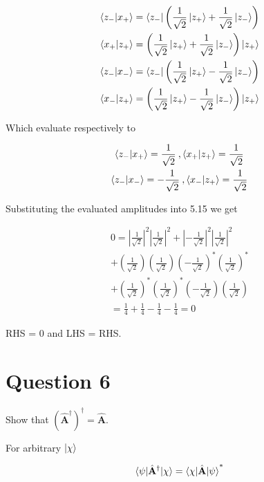\documentclass{article}
\let\oldhat\hat
\renewcommand{\hat}[1]{\oldhat{\mathbf{#1}}}
\begin{document}
    \begin{gather}
        \braket{z_-|x_+} = \bra{z_-}\left( \frac{1}{\sqrt{2}}\ket{z_+} + \frac{1}{\sqrt{2}}\ket{z_-} \right)\\
        \braket{x_+|z_+} = \left( \frac{1}{\sqrt{2}}\ket{z_+} + \frac{1}{\sqrt{2}}\ket{z_-} \right)\ket{z_+}\\
        \braket{z_-|x_-} = \bra{z_-}\left( \frac{1}{\sqrt{2}}\ket{z_+} - \frac{1}{\sqrt{2}}\ket{z_-} \right)\\
        \braket{x_-|z_+} = \left( \frac{1}{\sqrt{2}}\ket{z_+} - \frac{1}{\sqrt{2}}\ket{z_-} \right)\ket{z_+}
    \end{gather}

    Which evaluate respectively to

    \begin{gather}
        \braket{z_-|x_+} = \frac{1}{\sqrt{2}}\:,
        \braket{x_+|z_+} = \frac{1}{\sqrt{2}}\\
        \braket{z_-|x_-} = -\frac{1}{\sqrt{2}}\:,
        \braket{x_-|z_+} = \frac{1}{\sqrt{2}}
    \end{gather}

    Substituting the evaluated amplitudes into 5.15 we get

    \begin{gather*}
        0 = |\frac{1}{\sqrt{2}}|^2|\frac{1}{\sqrt{2}}|^2 + |-\frac{1}{\sqrt{2}}|^2|\frac{1}{\sqrt{2}}|^2\\
          + (\frac{1}{\sqrt{2}})(\frac{1}{\sqrt{2}})(-\frac{1}{\sqrt{2}})^*(\frac{1}{\sqrt{2}})^*\\
          + (\frac{1}{\sqrt{2}})^*(\frac{1}{\sqrt{2}})^*(-\frac{1}{\sqrt{2}})(\frac{1}{\sqrt{2}})\\
          = \frac{1}{4} + \frac{1}{4} - \frac{1}{4} - \frac{1}{4} = 0
    \end{gather*}

    RHS = 0 and LHS = RHS.

    


\section{Question 6}

Show that $(\hat{A}^{\dagger})^{\dagger} = \hat{A}$.

For arbitrary $\ket{\chi}$

\begin{gather}
    \braket{\psi|\hat{A}^\dagger|\chi} = \braket{\chi|\hat{A}|\psi}^*
\end{gather}
\end{document}
